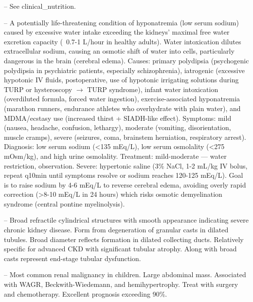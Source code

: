 -- See clinical\_nutrition.

-- A potentially life-threatening condition of hyponatremia (low serum sodium) caused by excessive water intake exceeding the kidneys' maximal free water excretion capacity (~0.7-1 L/hour in healthy adults). Water intoxication dilutes extracellular sodium, causing an osmotic shift of water into cells, particularly dangerous in the brain (cerebral edema). Causes: primary polydipsia (psychogenic polydipsia in psychiatric patients, especially schizophrenia), iatrogenic (excessive hypotonic IV fluids, postoperative, use of hypotonic irrigating solutions during TURP or hysteroscopy $\rightarrow$ TURP syndrome), infant water intoxication (overdiluted formula, forced water ingestion), exercise-associated hyponatremia (marathon runners, endurance athletes who overhydrate with plain water), and MDMA/ecstasy use (increased thirst + SIADH-like effect). Symptoms: mild (nausea, headache, confusion, lethargy), moderate (vomiting, disorientation, muscle cramps), severe (seizures, coma, brainstem herniation, respiratory arrest). Diagnosis: low serum sodium (<135 mEq/L), low serum osmolality (<275 mOsm/kg), and high urine osmolality. Treatment: mild-moderate — water restriction, observation. Severe: hypertonic saline (3\% NaCl, 1-2 mL/kg IV bolus, repeat q10min until symptoms resolve or sodium reaches 120-125 mEq/L). Goal is to raise sodium by 4-6 mEq/L to reverse cerebral edema, avoiding overly rapid correction (>8-10 mEq/L in 24 hours) which risks osmotic demyelination syndrome (central pontine myelinolysis).

-- Broad refractile cylindrical structures with smooth appearance indicating severe chronic kidney disease. Form from degeneration of granular casts in dilated tubules. Broad diameter reflects formation in dilated collecting ducts. Relatively specific for advanced CKD with significant tubular atrophy. Along with broad casts represent end-stage tubular dysfunction.

-- Most common renal malignancy in children. Large abdominal mass. Associated with WAGR, Beckwith-Wiedemann, and hemihypertrophy. Treat with surgery and chemotherapy. Excellent prognosis exceeding 90\%.
